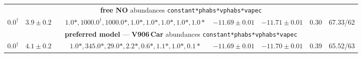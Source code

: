 \begin{table*}
\begin{tabular}{@{~}c@{~~}c@{~~}c@{~~}c@{~~}c@{~~}c@{~~}c@{~~}c@{~}}
\multicolumn{8}{c}{{\bf free NO} abundances \texttt{constant*phabs*vphabs*vapec}} \\
$0.0^\dagger$ & $3.9 \pm 0.2 $ & $ $ & $1.0*, 1000.0^\dagger, 1000.0*, 1.0*, 1.0*, 1.0*, 1.0*, 1.0* $ & $-11.69 \pm 0.01 $ & $-11.71 \pm 0.01 $ & 0.30 & 67.33/62 \\





\multicolumn{8}{c}{{\bf preferred model} --- {\bf V906\,Car} abundances \texttt{constant*phabs*vphabs*vapec}} \\
$0.0^\dagger$ & $4.1 \pm 0.2 $ & $ $ & $1.0*, 345.0*, 29.0*, 2.2*, 0.6*, 1.1*, 1.0*, 0.1* $ & $-11.69 \pm 0.01 $ & $-11.70 \pm 0.01 $ & 0.39 & 65.52/63 \\


\end{tabular}
\end{table*}
